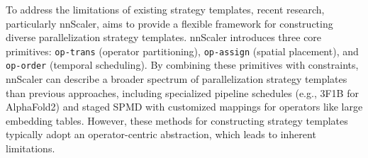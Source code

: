 \documentclass[letterpaper,twocolumn,10pt]{article}
\begin{document}

To address the limitations of existing strategy templates, recent research, particularly nnScaler, aims to provide a flexible framework for constructing diverse parallelization strategy templates. nnScaler introduces three core primitives: \texttt{op-trans} (operator partitioning), \texttt{op-assign} (spatial placement), and \texttt{op-order} (temporal scheduling). By combining these primitives with constraints, nnScaler can describe a broader spectrum of parallelization strategy templates than previous approaches, including specialized pipeline schedules (e.g., 3F1B for AlphaFold2) and staged SPMD with customized mappings for operators like large embedding tables. However, these methods for constructing strategy templates typically adopt an operator-centric abstraction, which leads to inherent limitations.
\end{document}
